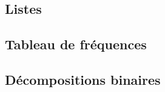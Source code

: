 

\usepackage{parcolumns}
\setlength{\parindent}{0pt}

 

\subsection{Listes}


\subsection{Tableau de fréquences}


\subsection{Décompositions binaires}


